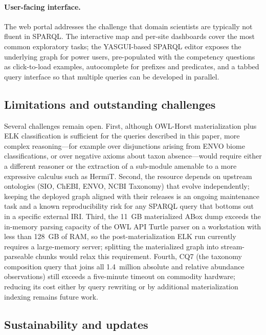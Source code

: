 \documentclass[11pt,a4paper]{article}
\begin{document}
\paragraph{User-facing interface.}
The web portal addresses the challenge that domain scientists are
typically not fluent in SPARQL. The interactive map and per-site
dashboards cover the most common exploratory tasks; the YASGUI-based
SPARQL editor exposes the underlying graph for power users,
pre-populated with the competency questions as click-to-load
examples, autocomplete for prefixes and predicates, and a tabbed
query interface so that multiple queries can be developed in
parallel.

\subsection{Limitations and outstanding challenges}

Several challenges remain open. First, although OWL-Horst
materialization plus ELK classification is sufficient for the
queries described in this paper, more complex reasoning---for
example over disjunctions arising from ENVO biome classifications,
or over negative axioms about taxon absence---would require either
a different reasoner or the extraction of a sub-module amenable to
a more expressive calculus such as HermiT. Second, the resource
depends on upstream ontologies (SIO, ChEBI, ENVO, NCBI Taxonomy)
that evolve independently; keeping the deployed graph aligned with
their releases is an ongoing maintenance task and a known
reproducibility risk for any SPARQL query that bottoms out in a
specific external IRI. Third, the 11~GB materialized ABox dump
exceeds the in-memory parsing capacity of the OWL API Turtle
parser on a workstation with less than 128~GB of RAM, so the
post-materialization ELK run currently requires a large-memory
server; splitting the materialized graph into stream-parseable
chunks would relax this requirement. Fourth, CQ7 (the taxonomy
composition query that joins all 1.4~million absolute and relative
abundance observations) still exceeds a five-minute timeout on
commodity hardware; reducing its cost either by query rewriting or
by additional materialization indexing remains future work.

\subsection{Sustainability and updates}
\end{document}

